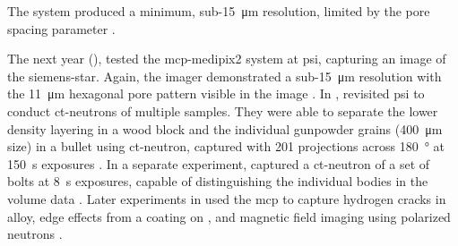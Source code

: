 \documentclass[../../../main.tex]{subfiles}
\begin{document}
    The system produced a minimum, sub-\SI{15}{\micro\meter} resolution, limited by the pore spacing parameter \cite{Tremsin_2008, Vallerga_2008}.
    \par%
    The next year (\citeyear*{Tremsin_2009}), \citeauthor*{Tremsin_2009} tested the \gls{mcp}-\gls{medipix2} system at \gls{psi}, capturing an image of the \gls{siemens-star}.
    Again, the imager demonstrated a sub-\SI{15}{\micro\meter} resolution with the \SI{11}{\micro\meter} hexagonal pore pattern visible in the image \cite{Tremsin_2009, Tremsin_2009a}.
    In \citeyear*{Tremsin_2011}, \citeauthor*{Tremsin_2011} revisited \gls{psi} to conduct \glspl{ct-neutron} of multiple samples.
    They were able to separate the lower density layering in a wood block and the individual gunpowder grains (\Xmath{\sim}\SI{400}{\micro\meter} size) in a bullet using \gls{ct-neutron}, captured with \num{201} projections across \SI{180}{\degree} at \SI{150}{\second} exposures \cite{Tremsin_2011}.
    In a separate experiment, \citeauthor*{Tremsin_2011a} captured a \gls{ct-neutron} of a set of bolts at \SI{8}{\second} exposures, capable of distinguishing the individual bodies in the volume data \cite{Tremsin_2011a}.
    Later experiments in \citeyear*{Tremsin_2015} used the \gls{mcp} to capture hydrogen cracks in  alloy, edge effects from a  coating on , and magnetic field imaging using polarized neutrons \cite{Tremsin_2015}.
\end{document}
